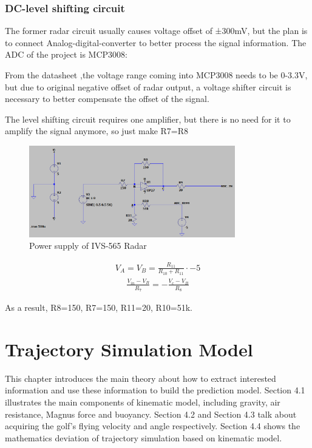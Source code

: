 \subsubsection{DC-level shifting circuit}
The former radar circuit usually causes voltage offset of ±300mV, but the plan is to connect Analog-digital-converter to better process the signal information. The ADC of the project is MCP3008:

From the datasheet \textcite{mcp3008},the voltage range coming into MCP3008 needs to be 0-3.3V, but due to original negative offset of radar output, a voltage shifter circuit is necessary to better compensate the offset of the signal.

The level shifting circuit requires one amplifier, but there is no need for it to amplify the signal anymore, so just make  R7=R8
\begin{figure}[H]
    \centering
    \includegraphics[width=0.8\textwidth]{figure/level shifting circuit.png}
    \caption{Power supply of IVS-565 Radar}
    \label{fig:power_radar}
\end{figure}

\begin{align}
V_{A}=V_{B}=\frac{R_{11}}{R_{10}+R_{11}}\cdot-5
\end{align}
\begin{align}
\frac{V_{i n}-V_{B}}{R_{7}}=-\frac{V_{c}-V_{B}}{R_{8}}
\end{align}

As a result, R8=150, R7=150, R11=20, R10=51k.


\newpage
\section{Trajectory Simulation Model}
This chapter introduces the main theory about how to extract interested information and use these information to build the prediction model. Section 4.1 illustrates the main components of kinematic model, including gravity, air resistance, Magnus force and buoyancy. Section 4.2 and Section 4.3 talk about acquiring the golf's flying velocity and angle respectively. Section 4.4 shows the mathematics deviation of trajectory simulation based on kinematic model.
